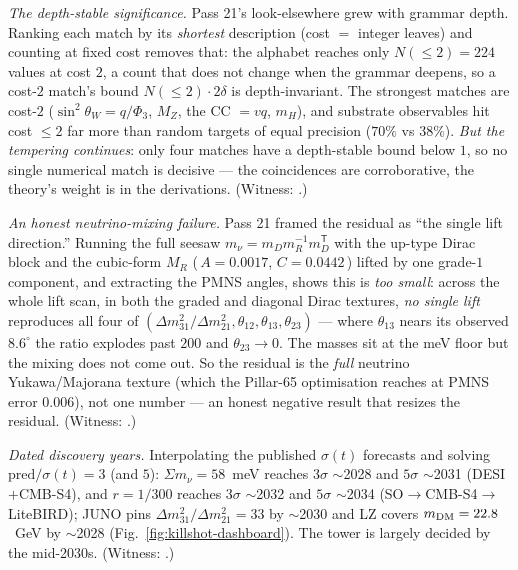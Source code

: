 \documentclass[11pt]{article}
\begin{document}
\emph{The depth-stable significance.} Pass 21's look-elsewhere grew with grammar depth. Ranking
each match by its \emph{shortest} description (cost $=$ integer leaves) and counting at fixed cost
removes that: the alphabet reaches only $N(\le2)=224$ values at cost $2$, a count that does not
change when the grammar deepens, so a cost-$2$ match's bound $N(\le2)\cdot2\delta$ is
depth-invariant. The strongest matches are cost-$2$ ($\sin^2\theta_W=q/\Phi_3$, $M_Z$, the CC
$=vq$, $m_H$), and substrate observables hit cost $\le2$ far more than random targets of equal
precision ($70\%$ vs $38\%$). \emph{But the tempering continues}: only four matches have a
depth-stable bound below $1$, so no single numerical match is decisive --- the coincidences are
corroborative, the theory's weight is in the derivations. (Witness:
.)

\emph{An honest neutrino-mixing failure.} Pass 21 framed the residual as ``the single lift
direction.'' Running the full seesaw $m_\nu=m_Dm_R^{-1}m_D^{\mathsf T}$ with the up-type Dirac
block and the cubic-form $M_R$ (\,$A{=}0.0017$, $C{=}0.0442$\,) lifted by one grade-$1$ component,
and extracting the PMNS angles, shows this is \emph{too small}: across the whole lift scan, in
both the graded and diagonal Dirac textures, \emph{no single lift} reproduces all four of
$(\Delta m^2_{31}/\Delta m^2_{21},\theta_{12},\theta_{13},\theta_{23})$ --- where $\theta_{13}$
nears its observed $8.6^\circ$ the ratio explodes past $200$ and $\theta_{23}\to0$. The masses sit
at the meV floor but the mixing does not come out. So the residual is the \emph{full} neutrino
Yukawa/Majorana texture (which the Pillar-65 optimisation reaches at PMNS error $0.006$), not one
number --- an honest negative result that resizes the residual. (Witness:
.)

\emph{Dated discovery years.} Interpolating the published $\sigma(t)$ forecasts and solving
$\mathrm{pred}/\sigma(t)=3$ (and $5$): $\Sigma m_\nu=58$~meV reaches $3\sigma$ $\sim$2028 and
$5\sigma$ $\sim$2031 (DESI$+$CMB-S4), and $r=1/300$ reaches $3\sigma$ $\sim$2032 and $5\sigma$
$\sim$2034 (SO$\to$CMB-S4$\to$LiteBIRD); JUNO pins $\Delta m^2_{31}/\Delta m^2_{21}=33$ by
$\sim$2030 and LZ covers $m_{\rm DM}=22.8$~GeV by $\sim$2028 (Fig.~\ref{fig:killshot-dashboard}).
The tower is largely decided by the mid-2030s. (Witness:
.)


\end{document}
